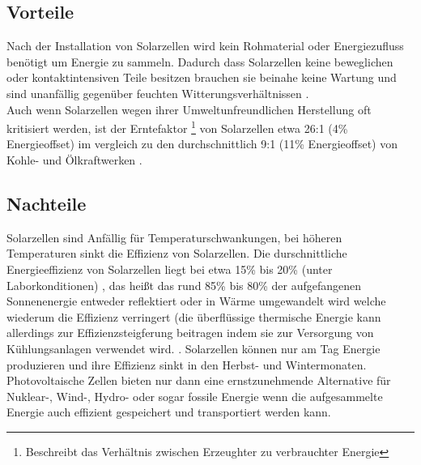 \subsection{Vorteile}
    Nach der Installation von Solarzellen wird kein Rohmaterial oder
    Energiezufluss benötigt um Energie zu sammeln. Dadurch dass
    Solarzellen keine beweglichen oder kontaktintensiven Teile besitzen
    brauchen sie beinahe keine Wartung und sind unanfällig gegenüber
    feuchten Witterungsverhältnissen \cite{SolarMaintenance}.\\
    Auch wenn Solarzellen wegen ihrer Umweltunfreundlichen Herstellung
    oft kritisiert werden, ist der Erntefaktor \footnote{Beschreibt das
    Verhältnis zwischen Erzeughter zu verbrauchter Energie} von
    Solarzellen etwa 26:1 (4\% Energieoffset) im vergleich zu den
    durchschnittlich 9:1 (11\% Energieoffset) von Kohle- und
    Ölkraftwerken \cite{SolarCarbonEmissions}.

\subsection{Nachteile}
    Solarzellen sind Anfällig für Temperaturschwankungen, bei
    höheren Temperaturen sinkt die Effizienz von Solarzellen. Die
    durschnittliche Energieeffizienz von Solarzellen liegt bei etwa
    15\% bis 20\% (unter Laborkonditionen) \cite{SolarEfficiency}, das
    heißt das rund 85\% bis 80\% der aufgefangenen Sonnenenergie
    entweder reflektiert oder in Wärme umgewandelt wird welche wiederum
    die Effizienz verringert (die überflüssige thermische Energie kann
    allerdings zur Effizienzsteigferung beitragen indem sie zur
    Versorgung von Kühlungsanlagen verwendet wird.
    \cite{YouTube_RE-SolarFlaw, PhotovoltaicPrinciples}.
    Solarzellen können nur am Tag Energie produzieren und ihre Effizienz
    sinkt in den Herbst- und Wintermonaten. Photovoltaische Zellen bieten
    nur dann eine ernstzunehmende Alternative für Nuklear-, Wind-, Hydro-
    oder sogar fossile Energie wenn die aufgesammelte Energie auch
    effizient gespeichert und transportiert werden kann.
